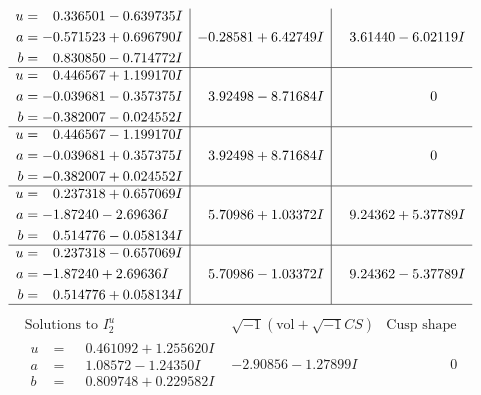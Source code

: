 \documentclass[1p]{elsarticle_modified}
\theoremstyle{definition}
\newcommand{\I}{\sqrt{-1}}
\begin{document}
$$\begin{array}{c|c|c}
\begin{aligned}
u &= \phantom{-}0.336501 - 0.639735 I \\
a &= -0.571523 + 0.696790 I \\
b &= \phantom{-}0.830850 - 0.714772 I\end{aligned}
 & -0.28581 + 6.42749 I & \phantom{-}3.61440 - 6.02119 I \\ \hline\begin{aligned}
u &= \phantom{-}0.446567 + 1.199170 I \\
a &= -0.039681 - 0.357375 I \\
b &= -0.382007 - 0.024552 I\end{aligned}
 & \phantom{-}3.92498 - 8.71684 I & \phantom{-0.000000 } 0 \\ \hline\begin{aligned}
u &= \phantom{-}0.446567 - 1.199170 I \\
a &= -0.039681 + 0.357375 I \\
b &= -0.382007 + 0.024552 I\end{aligned}
 & \phantom{-}3.92498 + 8.71684 I & \phantom{-0.000000 } 0 \\ \hline\begin{aligned}
u &= \phantom{-}0.237318 + 0.657069 I \\
a &= -1.87240 - 2.69636 I \\
b &= \phantom{-}0.514776 - 0.058134 I\end{aligned}
 & \phantom{-}5.70986 + 1.03372 I & \phantom{-}9.24362 + 5.37789 I \\ \hline\begin{aligned}
u &= \phantom{-}0.237318 - 0.657069 I \\
a &= -1.87240 + 2.69636 I \\
b &= \phantom{-}0.514776 + 0.058134 I\end{aligned}
 & \phantom{-}5.70986 - 1.03372 I & \phantom{-}9.24362 - 5.37789 I\\
 \hline 
 \end{array}$$\newpage$$\begin{array}{c|c|c}  
\text{Solutions to }I^u_{2}& \I (\text{vol} + \sqrt{-1}CS) & \text{Cusp shape}\\
 \hline 
\begin{aligned}
u &= \phantom{-}0.461092 + 1.255620 I \\
a &= \phantom{-}1.08572 - 1.24350 I \\
b &= \phantom{-}0.809748 + 0.229582 I\end{aligned}
 & -2.90856 - 1.27899 I & \phantom{-0.000000 } 0 \\ \hline\begin{aligned}

\end{aligned}
\end{array}$$
\end{document}
